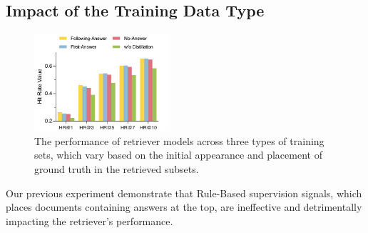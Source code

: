 \subsection{Impact of the Training Data Type} 
\label{sec:5-2}
\begin{figure}
    \centering
    \includegraphics[width=0.45\textwidth]{latex/pic/fig4.pdf}
    \caption{The performance of retriever models across three types of training sets, which vary based on the initial appearance and placement of ground truth in the retrieved subsets.}
    \label{fig:04}
    \vspace{-10pt}
\end{figure}
Our previous experiment demonstrate that Rule-Based supervision signals, which places documents containing answers at the top, are ineffective and detrimentally impacting the retriever's performance.
